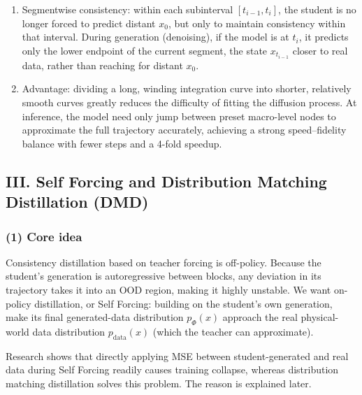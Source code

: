 \begin{enumerate}
\def\labelenumi{\arabic{enumi}.}
\setcounter{enumi}{1}
\item
  Segmentwise consistency: within each subinterval \([t_{i-1},t_i]\), the student is no longer forced to predict distant \(x_0\), but only to maintain consistency within that interval. During generation (denoising), if the model is at \(t_i\), it predicts only the lower endpoint of the current segment, the state \(x_{t_{i-1}}\) closer to real data, rather than reaching for distant \(x_0\).
\item
  Advantage: dividing a long, winding integration curve into shorter, relatively smooth curves greatly reduces the difficulty of fitting the diffusion process. At inference, the model need only jump between preset macro-level nodes to approximate the full trajectory accurately, achieving a strong speed--fidelity balance with fewer steps and a 4-fold speedup.
\end{enumerate}

\hypertarget{iii.-self-forcing-and-distribution-matching-distillation-dmd}{%
\subsection{III. Self Forcing and Distribution Matching Distillation (DMD)}\label{iii.-self-forcing-and-distribution-matching-distillation-dmd}}

\hypertarget{core-idea}{%
\subsubsection{(1) Core idea}\label{core-idea}}

Consistency distillation based on teacher forcing is off-policy. Because the student's generation is autoregressive between blocks, any deviation in its trajectory takes it into an OOD region, making it highly unstable. We want on-policy distillation, or Self Forcing: building on the student's own generation, make its final generated-data distribution \(p_\Phi(x)\) approach the real physical-world data distribution \(p_{\mathrm{data}}(x)\) (which the teacher can approximate).

Research shows that directly applying MSE between student-generated and real data during Self Forcing readily causes training collapse, whereas distribution matching distillation solves this problem. The reason is explained later.

